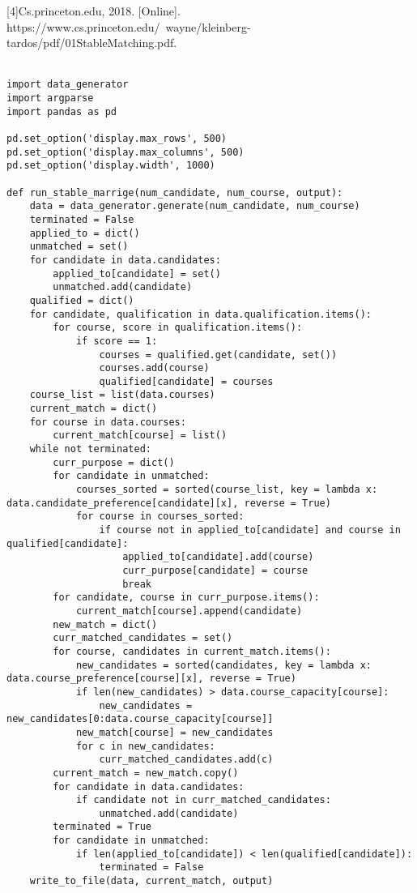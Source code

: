 \documentclass[twoside,twocolumn]{article}
\begin{document}
    [4]Cs.princeton.edu, 2018. [Online]. https://www.cs.princeton.edu/~wayne/kleinberg-tardos/pdf/01StableMatching.pdf. \\
    
    \mbox{~}
    \clearpage
    \begin{appendices}
        \begin{verbatim}
import data_generator
import argparse
import pandas as pd

pd.set_option('display.max_rows', 500)
pd.set_option('display.max_columns', 500)
pd.set_option('display.width', 1000)

def run_stable_marrige(num_candidate, num_course, output):
    data = data_generator.generate(num_candidate, num_course)
    terminated = False
    applied_to = dict()
    unmatched = set()
    for candidate in data.candidates:
        applied_to[candidate] = set()
        unmatched.add(candidate)
    qualified = dict()
    for candidate, qualification in data.qualification.items():
        for course, score in qualification.items():
            if score == 1:
                courses = qualified.get(candidate, set())
                courses.add(course)
                qualified[candidate] = courses
    course_list = list(data.courses)
    current_match = dict()
    for course in data.courses:
        current_match[course] = list()
    while not terminated:
        curr_purpose = dict()
        for candidate in unmatched:
            courses_sorted = sorted(course_list, key = lambda x: data.candidate_preference[candidate][x], reverse = True)
            for course in courses_sorted:
                if course not in applied_to[candidate] and course in qualified[candidate]:
                    applied_to[candidate].add(course)
                    curr_purpose[candidate] = course
                    break
        for candidate, course in curr_purpose.items():
            current_match[course].append(candidate)
        new_match = dict()
        curr_matched_candidates = set()
        for course, candidates in current_match.items():
            new_candidates = sorted(candidates, key = lambda x: data.course_preference[course][x], reverse = True)
            if len(new_candidates) > data.course_capacity[course]:
                new_candidates = new_candidates[0:data.course_capacity[course]]
            new_match[course] = new_candidates
            for c in new_candidates:
                curr_matched_candidates.add(c)
        current_match = new_match.copy()
        for candidate in data.candidates:
            if candidate not in curr_matched_candidates:
                unmatched.add(candidate)
        terminated = True
        for candidate in unmatched:
            if len(applied_to[candidate]) < len(qualified[candidate]):
                terminated = False
    write_to_file(data, current_match, output)


\end{verbatim}
\end{appendices}
\end{document}
